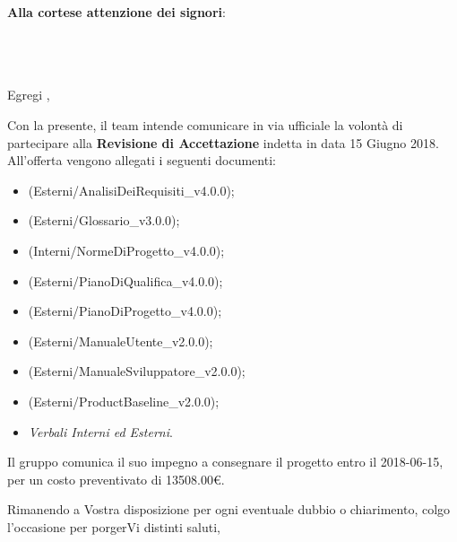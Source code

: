 \documentclass[11pt,a4paper]{letter}
\date{Padova, 13 Giugno 2018}
\begin{document}
    \frenchspacing

    \begin{letter}{
        \begin{flushright}
            \textbf{Alla cortese attenzione dei signori}: \\ \Committenteinriga{} \\ \Unipd \\ \Dipartimento \\ \ViaDipartimento{}
        \end{flushright}}

        \opening{ Egregi \Committenteinriga{}, }

        Con la presente, il team \GroupName{} intende comunicare in via ufficiale la volontà di partecipare alla
        \textbf{Revisione di Accettazione} indetta in data 15 Giugno 2018. \\
        All'offerta vengono allegati i seguenti documenti:

        \begin{itemize}
            \item \vAnalisiDeiRequisiti{} (Esterni/AnalisiDeiRequisiti\_v4.0.0);
            \item \vGlossario{} (Esterni/Glossario\_v3.0.0);
            \item \vNormeDiProgetto{} (Interni/NormeDiProgetto\_v4.0.0);
            \item \vPianoDiQualifica{} (Esterni/PianoDiQualifica\_v4.0.0);
            \item \vPianoDiProgetto{} (Esterni/PianoDiProgetto\_v4.0.0);
            \item \vManualeUtente{} (Esterni/ManualeUtente\_v2.0.0);
            \item \vManualeSviluppatore{} (Esterni/ManualeSviluppatore\_v2.0.0);
            \item \vProductBaseline{} (Esterni/ProductBaseline\_v2.0.0);
            \item \textit{Verbali Interni ed Esterni}.
        \end{itemize}

        Il gruppo \GroupName{} comunica il suo impegno a consegnare il progetto entro il 2018-06-15, per un costo
        preventivato di 13508.00\euro{}.

        Rimanendo a Vostra disposizione per ogni eventuale dubbio o chiarimento, colgo l'occasione per porgerVi
        distinti saluti,

        \closing{}
    \end{letter}
\end{document}
